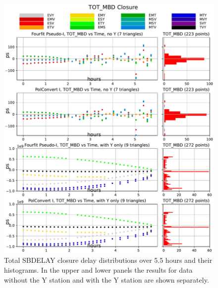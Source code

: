 \documentclass[letterpaper,twoside,12pt]{article}
\begin{document}
\begin{figure}[ht!]
  \begin{center}
  \includegraphics[width=40pc]{TOT_MBD_Closure_Delay_Y_no_Y.pdf}
  \caption{\small Total SBDELAY closure delay distributions over 5.5 hours and their histograms. In the upper and lower panels the results for data without the Y station and with the Y station are shown separately.}
  \label{tot_sbd}
  \end{center}
\end{figure}
\end{document}
